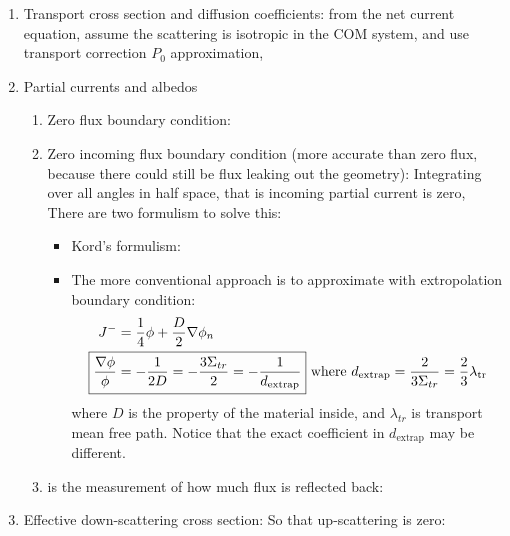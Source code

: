 \documentclass{school-22.211-notes}
\begin{document}
\clearpage
{} 
\begin{enumerate}
\item Transport cross section and diffusion coefficients: from the net current equation, assume the scattering is isotropic in the COM system, and use transport correction $P_0$ approximation, 

\item Partial currents and albedos
\begin{enumerate}
\item Zero flux boundary condition:

\item Zero incoming flux boundary condition (more accurate than zero flux, because there could still be flux leaking out the geometry):
Integrating over all angles in half space, that is incoming partial current is zero, 
There are two formulism to solve this:
  \begin{itemize}
  \item Kord's formulism: 
  \item The more conventional approach is to approximate with extropolation boundary condition: 
    \begin{align}
      J^- &= \frac{1}{4} \phi + \frac{D}{2} \gradient \phi_n \\
      \Aboxed{ \frac{\gradient \phi}{\phi} &= - \frac{1}{2D} = - \frac{3\Sigma_{tr}}{2} = - \frac{1}{d_{\mathrm{extrap}}}} 
\mbox{   where } d_{\mathrm{extrap}} = \frac{2}{3 \Sigma_{tr}}  = \frac{2}{3} \lambda_{\mathrm{tr}}
    \end{align}
    where $D$ is the property of the material inside, and $\lambda_{tr}$ is transport mean free path. Notice that the exact coefficient in $d_{\mathrm{extrap}}$ may be different. 
  \end{itemize}

\item {} is the measurement of how much flux is reflected back: 
\end{enumerate}

\item Effective down-scattering cross section: 
  So that up-scattering is zero: 


\end{enumerate}
\end{document}
